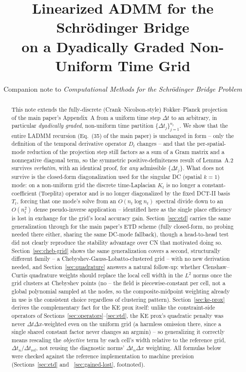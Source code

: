 \documentclass[11pt]{article}
\title{Linearized ADMM for the Schr\"odinger Bridge\\
       on a Dyadically Graded Non-Uniform Time Grid}
\author{Companion note to \emph{Computational Methods for the Schr\"odinger Bridge Problem}}
\date{}
\newcommand{\dt}{\Delta t}
\newcommand{\dx}{\Delta x}
\begin{document}
\maketitle

\begin{abstract}
This note extends the fully-discrete (Crank--Nicolson-style) Fokker--Planck projection of the
main paper's Appendix~A from a uniform time step $\dt$ to an arbitrary, in particular
\emph{dyadically graded}, non-uniform time partition $\{\dt_j\}_{j=1}^{n_t}$. We show that the
entire LADMM recursion (Eq.~(35) of the main paper) is unchanged in form -- only the definition
of the temporal derivative operator $D_t$ changes -- and that the per-spatial-mode reduction of
the projection step still factors as a sum of a Gram matrix and a nonnegative diagonal term,
so the symmetric positive-definiteness result of Lemma~A.2 survives \emph{verbatim}, with an
identical proof, for \emph{any} admissible $\{\dt_j\}$. What does not survive is the closed-form
diagonalization used for the singular DC (spatial $k{=}1$) mode: on a non-uniform grid the
discrete time-Laplacian $K_t$ is no longer a constant-coefficient (Toeplitz) operator and is no
longer diagonalized by the fixed DCT-II basis $T_t$, forcing that one mode's solve from an
$O(n_t\log n_t)$ spectral divide down to an $O(n_t^2)$ dense pseudo-inverse application --
identified here as the single place efficiency is lost in exchange for the grid's local
accuracy gain. Section~\ref{sec:etd} carries the same generalization through for the main
paper's ETD scheme (fully closed-form, no probing needed there either, sharing the same DC-mode
fallback), though a head-to-head test did not clearly reproduce the stability advantage over CN
that motivated doing so. Section~\ref{sec:cheb-grid} shows the same generalization covers a
second, structurally different family -- a Chebyshev-Gauss-Lobatto-clustered grid -- with no
new derivation needed, and Section~\ref{sec:quadrature} answers a natural follow-up: whether
Clenshaw--Curtis quadrature weights should replace the local cell width in the $L^2$ norms once
the grid clusters at Chebyshev points (no -- the field is piecewise-constant per cell, not a
global polynomial sampled at the nodes, so the composite-midpoint weighting already in use is
the consistent choice regardless of clustering pattern). Section~\ref{sec:ke-prox} derives the
complementary fact for the KE prox itself: unlike the constraint-side operators of
Sections~\ref{sec:operators}--\ref{sec:etd}, the KE prox's quadratic penalty was never
$\dt\dx$-weighted even on the uniform grid (a harmless omission there, since a single shared
constant factor never changes an argmin) -- so generalizing it correctly means rescaling the
\emph{objective} term by each cell's width relative to the reference grid, $\dt_n/\dt_\mathrm{ref}$,
not reusing the diagnostic norms' $\dt_n\dx$ weighting. All formulas below were checked against
the reference implementation to machine precision (Sections~\ref{sec:etd} and
~\ref{sec:gained-lost}, footnoted).
\end{abstract}
\end{document}
